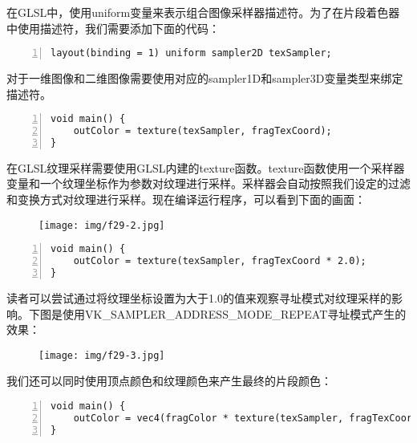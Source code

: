 \documentclass{ctexart}
\begin{document}
在GLSL中，使用uniform变量来表示组合图像采样器描述符。为了在片段着色器中使用描述符，我们需要添加下面的代码：

\begin{lstlisting}[language={[ANSI]C},keywordstyle=\color{blue!70},commentstyle=\color{red!50!green!50!blue!50},frame=shadowbox, rulesepcolor=\color{red!20!green!20!blue!20},basicstyle=\small,numbers=left, numberstyle=\tiny,breaklines=true]
layout(binding = 1) uniform sampler2D texSampler;
\end{lstlisting}

对于一维图像和二维图像需要使用对应的sampler1D和sampler3D变量类型来绑定描述符。

\begin{lstlisting}[language={[ANSI]C},keywordstyle=\color{blue!70},commentstyle=\color{red!50!green!50!blue!50},frame=shadowbox, rulesepcolor=\color{red!20!green!20!blue!20},basicstyle=\small,numbers=left, numberstyle=\tiny,breaklines=true]
void main() {
	outColor = texture(texSampler, fragTexCoord);
}
\end{lstlisting}

在GLSL纹理采样需要使用GLSL内建的texture函数。texture函数使用一个采样器变量和一个纹理坐标作为参数对纹理进行采样。采样器会自动按照我们设定的过滤和变换方式对纹理进行采样。现在编译运行程序，可以看到下面的画面：

\begin{figure}[H]
	\centering
	\texttt{[image: img/f29-2.jpg]}
\end{figure}

\begin{lstlisting}[language={[ANSI]C},keywordstyle=\color{blue!70},commentstyle=\color{red!50!green!50!blue!50},frame=shadowbox, rulesepcolor=\color{red!20!green!20!blue!20},basicstyle=\small,numbers=left, numberstyle=\tiny,breaklines=true]
void main() {
	outColor = texture(texSampler, fragTexCoord * 2.0);
}
\end{lstlisting}

读者可以尝试通过将纹理坐标设置为大于1.0的值来观察寻址模式对纹理采样的影响。下图是使用VK\_SAMPLER\_ADDRESS\_MODE\_REPEAT寻址模式产生的效果：

\begin{figure}[H]
	\centering
	\texttt{[image: img/f29-3.jpg]}
\end{figure}

我们还可以同时使用顶点颜色和纹理颜色来产生最终的片段颜色：

\begin{lstlisting}[language={[ANSI]C},keywordstyle=\color{blue!70},commentstyle=\color{red!50!green!50!blue!50},frame=shadowbox, rulesepcolor=\color{red!20!green!20!blue!20},basicstyle=\small,numbers=left, numberstyle=\tiny,breaklines=true]
void main() {
	outColor = vec4(fragColor * texture(texSampler, fragTexCoord).rgb, 1.0);
}
\end{lstlisting}
\end{document}
